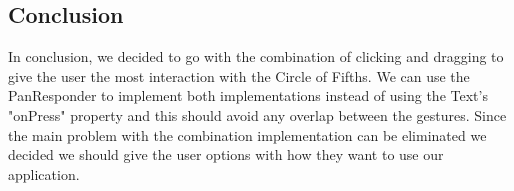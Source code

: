 \documentclass[onecolumn, draftclsnofoot,10pt, compsoc]{IEEEtran}
\begin{document}
\subsection{Conclusion}
In conclusion, we decided to go with the combination of clicking and dragging to give the user the most interaction with the Circle of Fifths.
We can use the PanResponder to implement both implementations instead of using the Text's "onPress" property and this should avoid any overlap between the gestures.
Since the main problem with the combination implementation can be eliminated we decided we should give the user options with how they want to use our application. 

\pagebreak


\end{document}
